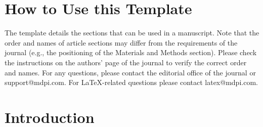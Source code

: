 \documentclass[journal,article,submit,pdftex,moreauthors]{Definitions/mdpi}
\begin{document}
\setcounter{section}{-1} %
\section{How to Use this Template}

The template details the sections that can be used in a manuscript. Note that the order and names of article sections may differ from the requirements of the journal (e.g., the positioning of the Materials and Methods section). Please check the instructions on the authors' page of the journal to verify the correct order and names. For any questions, please contact the editorial office of the journal or support@mdpi.com. For LaTeX-related questions please contact latex@mdpi.com.%


\section{Introduction}
\end{document}

